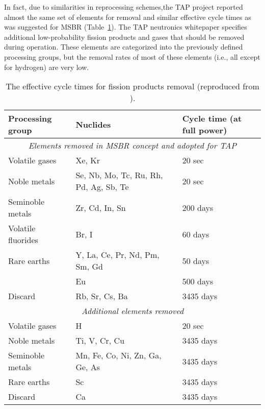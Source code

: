 In fact, due to similarities in reprocessing schemes,the  \gls{TAP} project reported 
almost 
the same set of elements for removal and similar effective cycle times as was suggested 
for \gls{MSBR} (Table~\ref{tab:reprocessing_list}). The \gls{TAP} neutronics whitepaper 
specifies additional low-probability fission products and gases that should be 
removed during operation. These elements are categorized into the previously 
defined processing groups, but the removal rates of most of these elements 
(i.e., all except for hydrogen) are very low.
\begin{table}[ht!]
        \centering
        \caption{The effective cycle times for fission products removal (reproduced from \cite{betzler_implementation_2017}).}
        \begin{tabular}{p{} p{} p{}}
        \hline 
        Processing group & \qquad\qquad\qquad Nuclides & Cycle time (at full power) \\ [5pt] \hline 
 \multicolumn{3}{c}{\textit{Elements removed in \gls{MSBR} concept and adopted for \gls{TAP}} \cite{robertson_conceptual_1971, rykhlevskii_modeling_2019}} \\
        Volatile gases & Xe, Kr								  & 20 sec \\ [5pt]
        Noble metals & Se, Nb, Mo, Tc, Ru, Rh, Pd, Ag, Sb, Te & 20 sec \\ [5pt]
        Seminoble metals & Zr, Cd, In, Sn	  				  & 200 days \\ [5pt]
        Volatile fluorides & Br, I 							  & 60 days \\ [5pt]
        Rare earths & Y, La, Ce, Pr, Nd, Pm, Sm, Gd & 50 days \\ [5pt]
        \qquad & Eu & 500 days \\ [5pt]
        Discard & Rb, Sr, Cs, Ba & 3435 days \\ [5pt] 
        \hline
 
 \multicolumn{3}{c}{\textit{Additional elements removed} \cite{transatomic_power_corporation_neutronics_2016}  } \\
        Volatile gases & H								  		& 20 sec    \\ [5pt]
        Noble metals & Ti, V, Cr, Cu						    & 3435 days \\ [5pt]
        Seminoble metals & Mn, Fe, Co, Ni, Zn, Ga, Ge, As       & 3435 days \\ [5pt]
        Rare earths & Sc										& 3435 days \\ [5pt]
        Discard & Ca											& 3435 days \\ [5pt] 
        \hline
        \end{tabular}
        \label{tab:reprocessing_list}
          \vspace{-0.9em}
\end{table}

